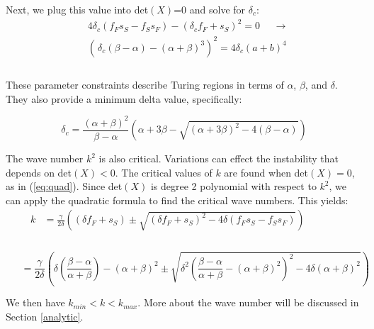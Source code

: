 \documentclass[12pt]{article}
\begin{document}
\noindent Next, we plug this value into det$(X)$=0 and solve for $\delta_c$:
\\
\begin{equation}
    \label{eq:min}
    \begin{aligned}
     &4\delta_c(f_Fs_S-f_Ss_F)-(\delta_c f_F+s_S)^2 = 0  ~~~~~~ \longrightarrow\\
     & \left(\frac{}{}\delta_c(\beta-\alpha)-(\alpha+\beta)^3\right)^2 = 4\delta_c(a+b)^4 \\
    \end{aligned}
\end{equation}
\\
These parameter constraints describe Turing regions in terms of $\alpha$, $\beta$, and $\delta$. They also provide a minimum delta value, specifically:

\begin{equation}
    \label{delta_c}
    \delta_c = \frac{(\alpha+\beta)^2}{\beta-\alpha}\left(\alpha+3\beta-\sqrt{(\alpha+3\beta)^2-4(\beta-\alpha)}\right)
\end{equation}


The wave number $k^2$ is also critical. Variations can effect the instability that depends on det$(X)<0$. The critical values of $k$ are found when det$(X)=0$, as in (\ref{eq:quad}). Since det$(X)$ is degree 2 polynomial with respect to $k^2$, we can apply the quadratic formula to find the critical wave numbers. This yields:
\\
\begin{equation}
    \label{kcrit}
    \begin{aligned}
        k &= \frac{\gamma}{2\delta}\left((\delta f_F+s_S) \pm \sqrt{(\delta f_F+s_S)^2 - 4\delta(f_Fs_S - f_Ss_F)}\right)~~~~~~~~~~~~~~~ \\
    \end{aligned}
\end{equation}
\\
$$ ~~~~~~~=\frac{\gamma}{2\delta}\left(\delta\left(\frac{\beta-\alpha}{\alpha+\beta}\right) -(\alpha+\beta)^2\pm \sqrt{\delta^2\left(\frac{\beta-\alpha}{\alpha+\beta}-(\alpha+\beta)^2\right)^2-4\delta(\alpha+\beta)^2}\right)$$

\noindent We then have $k_{min} < k < k_{max}$. More about the wave number will be discussed in Section \ref{analytic}.
\end{document}
